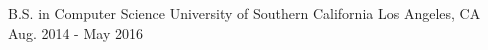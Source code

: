 

\begin{cventries}

  \cventry
    {B.S. in Computer Science} %
    {University of Southern California} %
    {Los Angeles, CA} %
    {Aug. 2014 - May 2016} %
    {
      \begin{cvitems} %
      \end{cvitems}
    }
\end{cventries}
